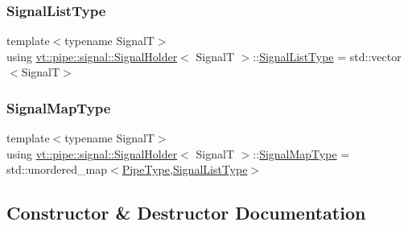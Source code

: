 \mbox{\label{structvt_1_1pipe_1_1signal_1_1_signal_holder_ab04d27c1c48b28813fdd8af29a4cda92}} 
\subsubsection{\texorpdfstring{Signal\+List\+Type}{SignalListType}}
{\footnotesize\ttfamily template$<$typename SignalT$>$ \\
using \hyperlink{structvt_1_1pipe_1_1signal_1_1_signal_holder}{vt\+::pipe\+::signal\+::\+Signal\+Holder}$<$ SignalT $>$\+::\hyperlink{structvt_1_1pipe_1_1signal_1_1_signal_holder_ab04d27c1c48b28813fdd8af29a4cda92}{Signal\+List\+Type} =  std\+::vector$<$SignalT$>$}

\mbox{\label{structvt_1_1pipe_1_1signal_1_1_signal_holder_a064e16bdc96f93675bc7fb967121a527}} 
\subsubsection{\texorpdfstring{Signal\+Map\+Type}{SignalMapType}}
{\footnotesize\ttfamily template$<$typename SignalT$>$ \\
using \hyperlink{structvt_1_1pipe_1_1signal_1_1_signal_holder}{vt\+::pipe\+::signal\+::\+Signal\+Holder}$<$ SignalT $>$\+::\hyperlink{structvt_1_1pipe_1_1signal_1_1_signal_holder_a064e16bdc96f93675bc7fb967121a527}{Signal\+Map\+Type} =  std\+::unordered\+\_\+map$<$\hyperlink{namespacevt_ac9852acda74d1896f48f406cd72c7bd3}{Pipe\+Type},\hyperlink{structvt_1_1pipe_1_1signal_1_1_signal_holder_ab04d27c1c48b28813fdd8af29a4cda92}{Signal\+List\+Type}$>$}



\subsection{Constructor \& Destructor Documentation}
\mbox{\label{structvt_1_1pipe_1_1signal_1_1_signal_holder_a9b8fde895ed00689216a5e4a7540cefa}} 
